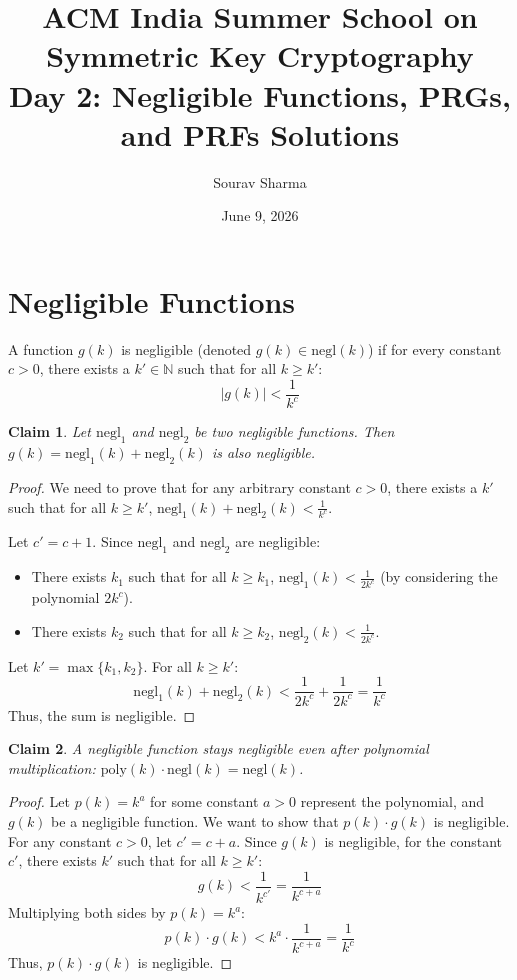 \documentclass{article}
\title{ACM India Summer School on Symmetric Key Cryptography \\ Day 2: Negligible Functions, PRGs, and PRFs Solutions}
\author{Sourav Sharma}
\date{June 9, 2026}
\newtheorem{claim}{Claim}
\begin{document}
\maketitle

\section{Negligible Functions}

A function $g(k)$ is negligible (denoted $g(k) \in \text{negl}(k)$) if for every constant $c > 0$, there exists a $k' \in \mathbb{N}$ such that for all $k \geq k'$:
\[
|g(k)| < \frac{1}{k^c}
\]

\begin{claim}
Let $\text{negl}_1$ and $\text{negl}_2$ be two negligible functions. Then $g(k) = \text{negl}_1(k) + \text{negl}_2(k)$ is also negligible.
\end{claim}
\begin{proof}
We need to prove that for any arbitrary constant $c > 0$, there exists a $k'$ such that for all $k \geq k'$, $\text{negl}_1(k) + \text{negl}_2(k) < \frac{1}{k^c}$.

Let $c' = c + 1$. Since $\text{negl}_1$ and $\text{negl}_2$ are negligible:
\begin{itemize}
    \item There exists $k_1$ such that for all $k \geq k_1$, $\text{negl}_1(k) < \frac{1}{2k^c}$ (by considering the polynomial $2k^c$).
    \item There exists $k_2$ such that for all $k \geq k_2$, $\text{negl}_2(k) < \frac{1}{2k^c}$.
\end{itemize}
Let $k' = \max\{k_1, k_2\}$. For all $k \geq k'$:
\[
\text{negl}_1(k) + \text{negl}_2(k) < \frac{1}{2k^c} + \frac{1}{2k^c} = \frac{1}{k^c}
\]
Thus, the sum is negligible.
\end{proof}

\begin{claim}
A negligible function stays negligible even after polynomial multiplication: $\text{poly}(k) \cdot \text{negl}(k) = \text{negl}(k)$.
\end{claim}
\begin{proof}
Let $p(k) = k^a$ for some constant $a > 0$ represent the polynomial, and $g(k)$ be a negligible function. We want to show that $p(k) \cdot g(k)$ is negligible.
For any constant $c > 0$, let $c' = c + a$. Since $g(k)$ is negligible, for the constant $c'$, there exists $k'$ such that for all $k \geq k'$:
\[
g(k) < \frac{1}{k^{c'}} = \frac{1}{k^{c+a}}
\]
Multiplying both sides by $p(k) = k^a$:
\[
p(k) \cdot g(k) < k^a \cdot \frac{1}{k^{c+a}} = \frac{1}{k^c}
\]
Thus, $p(k) \cdot g(k)$ is negligible.
\end{proof}
\end{document}
